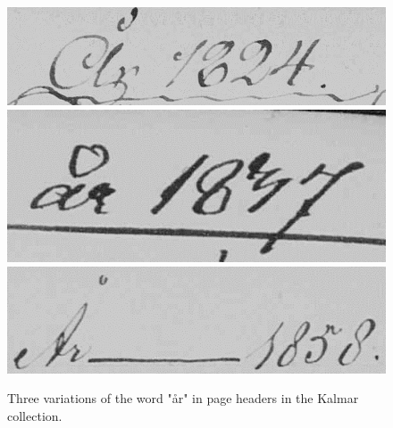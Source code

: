 
\begin{figure}
    \centering
    \includegraphics[scale=0.3]{resources/ar_kalmar/ar1824.png}
    \includegraphics[scale=0.3]{resources/ar_kalmar/ar1837.png}
    \includegraphics[scale=0.3]{resources/ar_kalmar/ar1858.png}
    \caption{Three variations of the word "\r{a}r" in page headers in the Kalmar collection.}
    \label{fig:aar}
\end{figure}